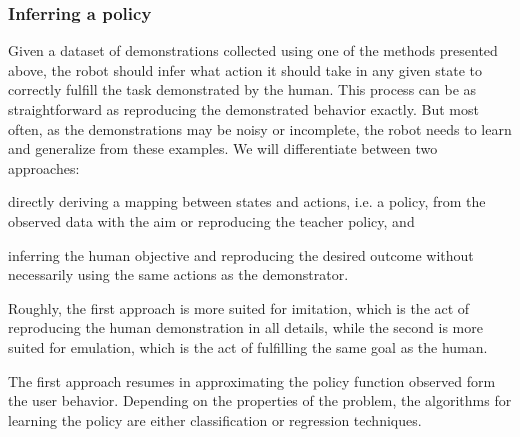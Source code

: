 \subsubsection*{Inferring a policy}

Given a dataset of demonstrations collected using one of the methods presented above, the robot should infer what action it should take in any given state to correctly fulfill the task demonstrated by the human. This process can be as straightforward as reproducing the demonstrated behavior exactly. But most often, as the demonstrations may be noisy or incomplete, the robot needs to learn and generalize from these examples. We will differentiate between two approaches: \begin{inparaenum}[(a)] \item directly deriving a mapping between states and actions, i.e. a policy, from the observed data with the aim or reproducing the teacher policy, and \item inferring the human objective and reproducing the desired outcome without necessarily using the same actions as the demonstrator. \end{inparaenum} Roughly, the first approach is more suited for imitation, which is the act of reproducing the human demonstration in all details, while the second is more suited for emulation, which is the act of fulfilling the same goal as the human.

The first approach resumes in approximating the policy function observed form the user behavior. Depending on the properties of the problem, the algorithms for learning the policy are either classification or regression techniques. 


